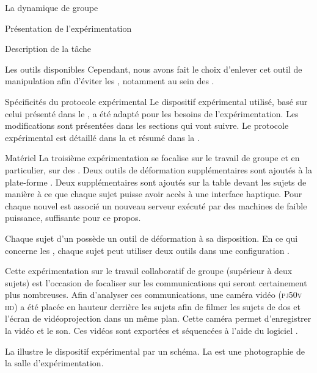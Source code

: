 \documentclass[myfrancais]{mythesis}
\begin{document}
\begin{mychapter}{La dynamique de groupe}
\begin{mysection}{Présentation de l'expérimentation}
\begin{mysubsection}{Description de la tâche}
\begin{mysubsubsection}{Les outils disponibles}
					Cependant, nous avons fait le choix d'enlever cet outil de manipulation afin d'éviter les , notamment au sein des .
				\end{mysubsubsection}
			\end{mysubsection}
			\begin{mysubsection}{Spécificités du protocole expérimental}
				Le dispositif expérimental utilisé, basé sur celui présenté dans le , a été adapté pour les besoins de l'expérimentation.
				Les modifications sont présentées dans les sections qui vont suivre.
				Le protocole expérimental est détaillé dans la  et résumé dans la .
				\begin{mysubsubsection}[sss-exp3-Materiel]{Matériel}
					La troisième expérimentation se focalise sur le travail de groupe et en particulier, sur des .
					Deux outils de déformation supplémentaires sont ajoutés à la plate-forme .
					Deux \myOmni supplémentaires sont ajoutés sur la table devant les sujets de manière à ce que chaque sujet puisse avoir accès à une interface haptique.
					Pour chaque nouvel \myOmni est associé un nouveau serveur  exécuté par des machines de faible puissance, suffisante pour ce propos.

					Chaque sujet d'un  possède un outil de déformation à sa disposition.
					En ce qui concerne les , chaque sujet peut utiliser deux outils dans une configuration .

					Cette expérimentation sur le travail collaboratif de groupe (supérieur à deux sujets) est l'occasion de focaliser sur les communications qui seront certainement plus nombreuses.
					Afin d'analyser ces communications, une caméra vidéo \mySony (\textsc{pj50v hd}) a été placée en hauteur derrière les sujets afin de filmer les sujets de dos et l'écran de vidéoprojection dans un même plan.
					Cette caméra permet d'enregistrer la vidéo et le son.
					Ces vidéos sont exportées et séquencées \myafortiori à l'aide du logiciel \myiMovie.

					La  illustre le dispositif expérimental par un schéma.
					La  est une photographie de la salle d'expérimentation.


\end{mysubsubsection}
\end{mysubsection}
\end{mysection}
\end{mychapter}
\end{document}
